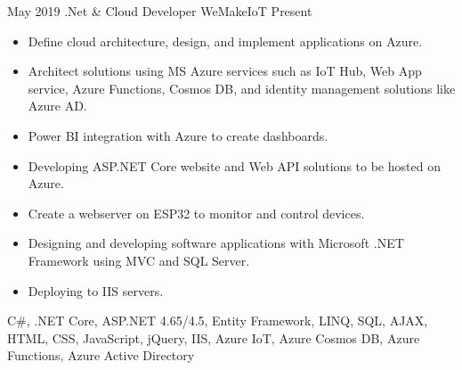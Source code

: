 %
%
%


\begin{experiences}
    \experience
        {May 2019}
        {.Net \& Cloud Developer}
        {WeMakeIoT}
        {Present}
        {
            \begin{itemize}
                \item Define cloud architecture, design, and implement applications on Azure.
                \item Architect solutions using MS Azure services such as IoT Hub, Web App service, Azure Functions, Cosmos DB, and identity management solutions like Azure AD.
                \item Power BI integration with Azure to create dashboards.
                \item Developing ASP.NET Core website and Web API solutions to be hosted on Azure.
                \item Create a webserver on ESP32 to monitor and control devices.
				\item Designing and developing software applications with Microsoft .NET Framework using MVC and SQL Server.
				\item Deploying to IIS servers.
            \end{itemize}
        }
        {
            C\#,
            .NET Core,
            ASP.NET 4.65/4.5,
            Entity Framework,
            LINQ,
            SQL,
            AJAX,
            HTML, 
            CSS, 
            JavaScript,
            jQuery,
            IIS,
            Azure IoT, 
            Azure Cosmos DB, 
            Azure Functions,
            Azure Active Directory
        }

    \emptySeparator


\end{experiences}
